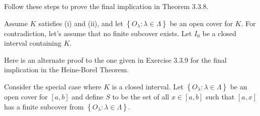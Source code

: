 \begin{exercise}
  Follow these steps to prove the final implication in Theorem 3.3.8.

  Assume $K$ satisfies (i) and (ii), and let $\left\{O_{\lambda}: \lambda \in \Lambda\right\}$ be an open cover for $K$. For contradiction, let's assume that no finite subcover exists. Let $I_{0}$ be a closed interval containing $K$.
\end{exercise}

\begin{solution}
  \enum{
  \item \TODO
  \item \TODO
  \item \TODO
  }
\end{solution}

\begin{exercise}
  Here is an alternate proof to the one given in Exercise 3.3.9 for the final implication in the Heine-Borel Theorem.

  Consider the special case where $K$ is a closed interval. Let $\left\{O_{\lambda}: \lambda \in \Lambda\right\}$ be an open cover for $[a, b]$ and define $S$ to be the set of all $x \in[a, b]$ such that $[a, x]$ has a finite subcover from $\left\{O_{\lambda}: \lambda \in \Lambda\right\}$.
\end{exercise}

\begin{solution}
  \enum{
  \item \TODO
  \item \TODO
  \item \TODO
  }
\end{solution}

